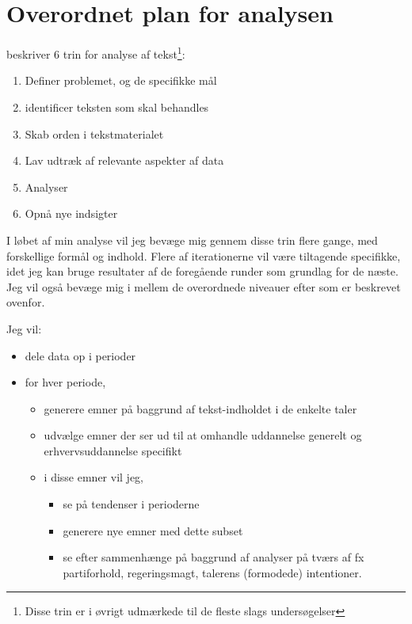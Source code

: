\section{Overordnet plan for analysen}\label{sec:plan}

\autocite[s. 17]{kwartlerTextMiningPractice2017} beskriver 6 trin for analyse af tekst\footnote{Disse
  trin er i øvrigt udmærkede til de fleste slags undersøgelser}:
\begin{enumerate}
  \item
    Definer problemet, og de specifikke mål
  \item
    identificer teksten som skal behandles
  \item
    Skab orden i tekstmaterialet
  \item
    Lav udtræk af relevante aspekter af data
  \item
    Analyser
  \item
    Opnå nye indsigter
\end{enumerate}

I løbet af min analyse vil jeg bevæge mig gennem disse trin flere gange, med forskellige formål og indhold.
Flere af iterationerne vil være tiltagende specifikke, idet jeg kan bruge resultater af de foregående runder som grundlag for de næste.
Jeg vil også bevæge mig i mellem de overordnede niveauer efter \autocite{evansMachineTranslationMining2016} som er beskrevet ovenfor.

Jeg vil:

\begin{itemize}
  \item
    dele data op i perioder
  \item
    for hver periode,
    \begin{itemize}
      \item
        generere emner på baggrund af tekst-indholdet i de enkelte taler
      \item
        udvælge emner der ser ud til at omhandle uddannelse generelt og erhvervsuddannelse specifikt
      \item
        i disse emner vil jeg, 
        \begin{itemize}
          \item
            se på tendenser i perioderne
          \item
            generere nye emner med dette subset
          \item
            se efter sammenhænge på baggrund af analyser på tværs af fx partiforhold, regeringsmagt, talerens (formodede) intentioner.
        \end{itemize}
    \end{itemize}
\end{itemize}


